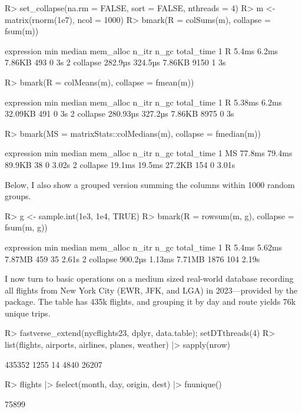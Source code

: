 \documentclass[nojss]{jss} %
\begin{document}
\begin{Schunk}
\begin{Sinput}
R> set_collapse(na.rm = FALSE, sort = FALSE, nthreads = 4)
R> m <- matrix(rnorm(1e7), ncol = 1000)
R> bmark(R = colSums(m), collapse = fsum(m))
\end{Sinput}
\begin{Soutput}
  expression     min  median mem_alloc n_itr n_gc total_time
1          R   5.4ms   6.2ms    7.86KB   493    0         3s
2   collapse 282.9µs 324.5µs    7.86KB  9150    1         3s
\end{Soutput}
\begin{Sinput}
R> bmark(R = colMeans(m), collapse = fmean(m))
\end{Sinput}
\begin{Soutput}
  expression      min  median mem_alloc n_itr n_gc total_time
1          R   5.38ms   6.2ms   32.09KB   491    0         3s
2   collapse 280.93µs 327.2µs    7.86KB  8975    0         3s
\end{Soutput}
\begin{Sinput}
R> bmark(MS = matrixStats::colMedians(m), collapse = fmedian(m))
\end{Sinput}
\begin{Soutput}
  expression    min median mem_alloc n_itr n_gc total_time
1         MS 77.8ms 79.4ms    89.9KB    38    0      3.02s
2   collapse 19.1ms 19.5ms    27.2KB   154    0      3.01s
\end{Soutput}
\end{Schunk}
%
Below, I also show a grouped version summing the columns within 1000 random groups.
%
\begin{Schunk}
\begin{Sinput}
R> g <- sample.int(1e3, 1e4, TRUE)
R> bmark(R = rowsum(m, g), collapse = fsum(m, g))
\end{Sinput}
\begin{Soutput}
  expression     min median mem_alloc n_itr n_gc total_time
1          R   5.4ms 5.62ms    7.87MB   459   35      2.61s
2   collapse 900.2µs 1.13ms    7.71MB  1876  104      2.19s
\end{Soutput}
\end{Schunk}
%
I now turn to basic operations on a medium sized real-world database recording all flights from New York City (EWR, JFK, and LGA) in 2023---provided by the  package. The  table has 435k flights, and grouping it by day and route yields 76k unique trips.
%
\begin{Schunk}
\begin{Sinput}
R> fastverse_extend(nycflights23, dplyr, data.table); setDTthreads(4)
R> list(flights, airports, airlines, planes, weather) |> sapply(nrow)
\end{Sinput}
\begin{Soutput}
[1] 435352   1255     14   4840  26207
\end{Soutput}
\begin{Sinput}
R> flights |> fselect(month, day, origin, dest) |> fnunique()
\end{Sinput}
\begin{Soutput}
[1] 75899
\end{Soutput}
\end{Schunk}
\end{document}
